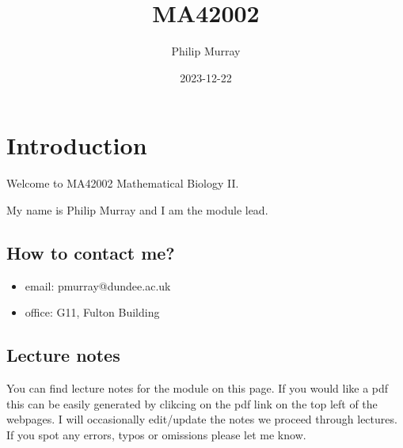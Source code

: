 \documentclass[
  letterpaper,
  DIV=11,
  numbers=noendperiod]{scrreprt}
\title{MA42002}
\author{Philip Murray}
\date{2023-12-22}
\providecommand{\tightlist}{%
  \setlength{\itemsep}{0pt}\setlength{\parskip}{0pt}}\usepackage{longtable,booktabs,array}
\renewcommand*\contentsname{Table of contents}
\newcommand\contentsname{Table of contents}
\theoremstyle{plain}
\theoremstyle{definition}
\theoremstyle{plain}
\theoremstyle{remark}
\begin{document}
\maketitle
\ifdefined\Shaded\renewenvironment{Shaded}{\begin{tcolorbox}[breakable, borderline west={3pt}{0pt}{shadecolor}, sharp corners, interior hidden, boxrule=0pt, enhanced, frame hidden]}{\end{tcolorbox}}\fi

\renewcommand*\contentsname{Table of contents}
{
\hypersetup{linkcolor=}
\setcounter{tocdepth}{2}
\tableofcontents
}

\hypertarget{introduction}{%
\chapter*{Introduction}\label{introduction}}


Welcome to MA42002 Mathematical Biology II.

My name is Philip Murray and I am the module lead.

\hypertarget{how-to-contact-me}{%
\section*{How to contact me?}\label{how-to-contact-me}}


\begin{itemize}
\tightlist
\item
  email: pmurray@dundee.ac.uk
\item
  office: G11, Fulton Building
\end{itemize}

\hypertarget{lecture-notes}{%
\section*{Lecture notes}\label{lecture-notes}}


You can find lecture notes for the module on this page. If you would
like a pdf this can be easily generated by clikcing on the pdf link on
the top left of the webpages. I will occasionally edit/update the notes
we proceed through lectures. If you spot any errors, typos or omissions
please let me know.
\end{document}
